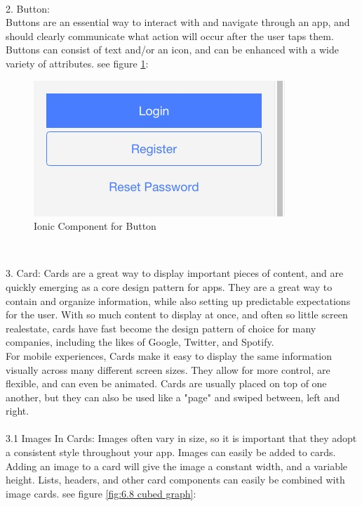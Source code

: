 \\ 2. Button: \\ Buttons are an essential way to interact with and navigate through an app, and should clearly communicate what action will occur after the user taps them. Buttons can consist of text and/or an icon, and can be enhanced with a wide variety of attributes. see figure \ref{fig:6.7 cubed graph}:
\begin{figure}[h]
	\centering
	\includegraphics[scale=0.6]{img/ionicButton.png}
	\caption{Ionic Component for Button}
	\label{fig:6.7 cubed graph}
\end{figure} \\
\item 3. Card: Cards are a great way to display important pieces of content, and are quickly emerging as a core design pattern for apps. They are a great way to contain and organize information, while also setting up predictable expectations for the user. With so much content to display at once, and often so little screen realestate, cards have fast become the design pattern of choice for many companies, including the likes of Google, Twitter, and Spotify. \\ For mobile experiences, Cards make it easy to display the same information visually across many different screen sizes. They allow for more control, are flexible, and can even be animated. Cards are usually placed on top of one another, but they can also be used like a "page" and swiped between, left and right. \\ \\ 
3.1 Images In Cards: Images often vary in size, so it is important that they adopt a consistent style throughout your app. Images can easily be added to cards. Adding an image to a card will give the image a constant width, and a variable height. Lists, headers, and other card components can easily be combined with image cards. see figure \ref{fig:6.8 cubed graph}:
